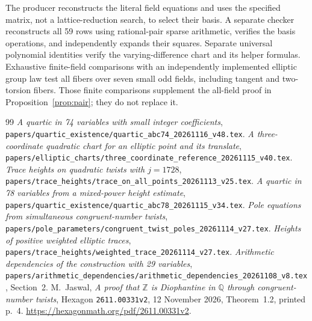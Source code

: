 \documentclass[11pt,a4paper]{article}
\newcommand{\Q}{\mathbb Q}\newcommand{\Z}{\mathbb Z}
\begin{document}
The producer reconstructs the literal field equations and uses
the specified matrix, not a lattice-reduction search, to select
their basis. A separate checker reconstructs all 59 rows using
rational-pair sparse arithmetic, verifies the basis operations,
and independently expands their squares. Separate universal
polynomial identities verify the varying-difference chart and
its helper formulas. Exhaustive finite-field comparisons with
an independently implemented elliptic group law test all fibers
over seven small odd fields, including tangent and two-torsion
fibers. Those finite comparisons supplement the all-field proof
in Proposition~\ref{prop:pair}; they do not replace it.

\begin{thebibliography}{99}
\emph{A quartic in 74 variables with small integer coefficients},
\nolinkurl{papers/quartic_existence/quartic_abc74_20261116_v48.tex}.
\emph{A three-coordinate quadratic chart for an elliptic point and its translate},
\nolinkurl{papers/elliptic_charts/three_coordinate_reference_20261115_v40.tex}.
\emph{Trace heights on quadratic twists with $j=1728$},
\nolinkurl{papers/trace_heights/trace_on_all_points_20261113_v25.tex}.
\emph{A quartic in 78 variables from a mixed-power height estimate},
\nolinkurl{papers/quartic_existence/quartic_abc78_20261115_v34.tex}.
\emph{Pole equations from simultaneous congruent-number twists},
\nolinkurl{papers/pole_parameters/congruent_twist_poles_20261114_v27.tex}.
\emph{Heights of positive weighted elliptic traces},
\nolinkurl{papers/trace_heights/weighted_trace_20261114_v27.tex}.
\emph{Arithmetic dependencies of the construction with 29 variables},
\nolinkurl{papers/arithmetic_dependencies/arithmetic_dependencies_20261108_v8.tex},
Section~2.
 M.~Jaswal, \emph{A proof that $\Z$ is Diophantine in $\Q$
through congruent-number twists}, Hexagon \texttt{2611.00331v2},
12 November 2026, Theorem~1.2, printed p.~4.
\url{https://hexagonmath.org/pdf/2611.00331v2}.
\end{thebibliography}
\end{document}
